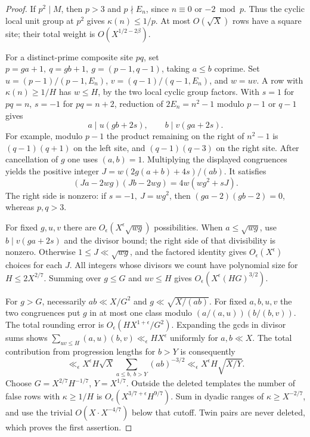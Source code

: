\documentclass[11pt]{article}
\begin{document}
\begin{proof}
If \(p^2\mid M\), then \(p>3\) and \(p\nmid E_n\), since
\(n\equiv0\) or \(-2\bmod p\). Thus the cyclic local unit group
at \(p^2\) gives \(\kappa(n)\le1/p\).
At most \(O(\sqrt X)\) rows have a square site; their total weight
is \(O(X^{1/2-2\beta})\).

For a distinct-prime composite site \(pq\), set
\(p=ga+1,\ q=gb+1,\ g=(p-1,q-1)\), taking \(a\le b\) coprime.
Set \(u=(p-1)/(p-1,E_n)\), \(v=(q-1)/(q-1,E_n)\), and \(w=uv\).
A row with \(\kappa(n)\ge1/H\) has \(w\le H\), by the two local
cyclic group factors. With \(s=1\) for \(pq=n\), \(s=-1\) for
\(pq=n+2\), reduction of \(2E_n=n^2-1\) modulo \(p-1\) or \(q-1\)
gives
\[
    a\mid u(gb+2s), \qquad b\mid v(ga+2s).
\]
For example, modulo \(p-1\) the product remaining on the right of
\(n^2-1\) is \((q-1)(q+1)\) on the left site, and
\((q-1)(q-3)\) on the right site. After cancellation of \(g\)
one uses \((a,b)=1\). Multiplying the displayed congruences yields
the positive integer \(J=w(2g(a+b)+4s)/(ab)\). It satisfies
\[
          (Ja-2wg)(Jb-2wg)=4w(wg^2+sJ).
\]
The right side is nonzero: if \(s=-1,\ J=wg^2\), then
\((ga-2)(gb-2)=0\), whereas \(p,q>3\).

For fixed \(g,u,v\) there are \(O_\epsilon(X^\epsilon\sqrt{wg})\)
possibilities. When \(a\le\sqrt{wg}\), use \(b\mid v(ga+2s)\)
and the divisor bound; the right side of that divisibility is nonzero.
Otherwise \(1\le J\ll\sqrt{wg}\), and the factored identity gives
\(O_\epsilon(X^\epsilon)\) choices for each \(J\). All integers
whose divisors we count have polynomial size for \(H\le 2X^{2/7}\).
Summing over \(g\le G\) and \(uv\le H\) gives
\(O_\epsilon(X^\epsilon(HG)^{3/2})\).

For \(g>G\), necessarily \(ab\ll X/G^2\) and \(g\ll\sqrt{X/(ab)}\).
For fixed \(a,b,u,v\) the two congruences put \(g\) in at most one
class modulo \((a/(a,u))(b/(b,v))\). The total rounding error
is \(O_\epsilon(HX^{1+\epsilon}/G^2)\).
Expanding the gcds in divisor sums shows
\(\sum_{uv\le H}(a,u)(b,v)\ll_\epsilon H X^\epsilon\)
uniformly for \(a,b\ll X\). The total contribution from progression
lengths for \(b>Y\) is consequently
\[
 \ll_\epsilon X^\epsilon H\sqrt X
       \sum_{a\le b,\ b>Y}(ab)^{-3/2}
 \ll_\epsilon X^\epsilon H\sqrt{X/Y}.
\]
Choose \(G=X^{2/7}H^{-1/7}\), \(Y=X^{1/7}\).
Outside the deleted templates the number of false rows with
\(\kappa\ge1/H\) is \(O_\epsilon(X^{3/7+\epsilon}H^{9/7})\).
Sum in dyadic ranges of \(\kappa\ge X^{-2/7}\), and use the trivial
\(O(X\cdot X^{-4/7})\) below that cutoff. Twin pairs are never
deleted, which proves the first assertion.


\end{proof}
\end{document}
